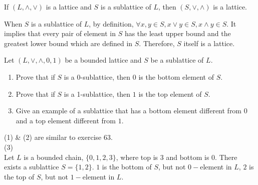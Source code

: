 \documentclass[11pt,a4paper]{exam}
\newcommand{\join}{\vee}
\newcommand{\meet}{\wedge}
\begin{document}
\begin{exo}
    If $(L, \meet, \join)$ is a lattice and $S$ is a sublattice of $L$, then $(S, \join, \meet)$ is a lattice.

    \begin{sol}
        When $S$ is a sublattice of $L$, by definition, $\forall x, y \in S, x \join y \in S, x \meet y \in S$. It implies that every pair of element in $S$ has the least upper bound and the greatest lower bound which are defined in $S$. Therefore, $S$ itself is a lattice.
    \end{sol}
\end{exo}

\begin{exo}
    Let $(L, \join, \meet, 0, 1)$ be a bounded lattice and $S$ be a sublattice of $L$.
    \begin{enumerate}
        \item Prove that if $S$ is a 0-sublattice, then $0$ is the bottom element of $S$.
        \item Prove that if $S$ is a 1-sublattice, then $1$ is the top element of $S$.
        \item Give an example of a sublattice that has a bottom element different from $0$ and a top element different from $1$.
    \end{enumerate}

    \begin{sol}
        (1) \& (2) are similar to exercise 63. \\ 
        (3) \\ 
        Let $L$ is a bounded chain, $\{0, 1, 2, 3\}$, where top is $3$ and bottom is $0$. There exists a sublattice $S = \{1, 2\}$. $1$ is the bottom of $S$, but not $0-$element in $L$, $2$ is the top of $S$, but not $1-$element in $L$.
    \end{sol}
\end{exo}
\end{document}

